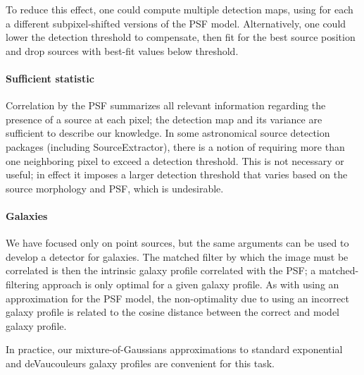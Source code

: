 \documentclass[letterpaper,preprint]{aastex62}
\begin{document}
To reduce this effect, one could compute multiple detection maps,
using for each a different subpixel-shifted versions of the PSF model.
Alternatively, one could lower the detection threshold to compensate,
then fit for the best source position and drop sources with best-fit
values below threshold.


\paragraph{Sufficient statistic}  Correlation by the PSF summarizes
all relevant information regarding the presence of a source at each
pixel; the detection map and its variance are sufficient to describe
our knowledge.  In some astronomical source detection packages
(including SourceExtractor), there is a notion of requiring more than
one neighboring pixel to exceed a detection threshold.  This is not
necessary or useful; in effect it imposes a larger detection threshold
that varies based on the source morphology and PSF, which is
undesirable.



\paragraph{Galaxies}
We have focused only on point sources, but the same arguments can be
used to develop a detector for galaxies.  The matched filter by which
the image must be correlated is then the intrinsic galaxy profile
correlated with the PSF; a matched-filtering approach is only optimal
for a given galaxy profile.  As with using an approximation for the
PSF model, the non-optimality due to using an incorrect galaxy profile
is related to the cosine distance between the correct and model galaxy
profile.

In practice, our mixture-of-Gaussians approximations to standard
exponential and deVaucouleurs galaxy profiles \cite{gaussgals} are
convenient for this task.
\end{document}
